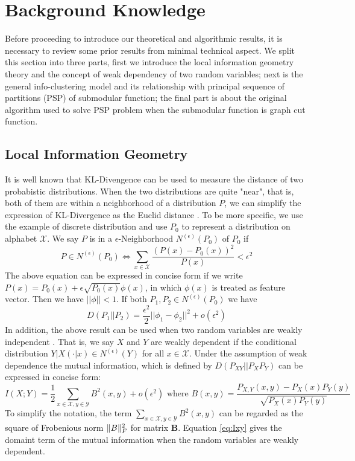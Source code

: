\section{Background Knowledge}\label{sec:bk}
Before proceeding to introduce our theoretical and algorithmic results, it is necessary to review some prior results from minimal technical aspect. We split this section into three parts, first we introduce
the local information geometry theory and the concept of weak dependency of two random variables;
next is the general info-clustering model and its relationship with principal sequence of partitions (PSP) of submodular function;
the final part is about the original algorithm used to solve PSP problem when the submodular function
is graph cut function.
\subsection{Local Information Geometry}
It is well known that KL-Divengence can be used to measure the distance of two probabistic distributions. When the two distributions are quite "near", that is, both of them are within a neighborhood of a distribution $P$, we can simplify the expression of KL-Divergence as the Euclid distance \citep{huang2017information}. To be more specific, we use the example of discrete distribution and use $P_0$ to represent a distribution on alphabet $\mathcal{X}$. We say $P$ is in a $\epsilon$-Neighborhood $N^{(\epsilon)}(P_0)$ of $P_0$ if
\begin{equation}
P \in N^{(\epsilon)}(P_0) \iff \sum_{x \in \mathcal{X}} \frac{(P(x) - P_0(x))^2}{P(x)} < \epsilon^2
\end{equation}
The above equation can be expressed in concise form if we write $P(x) = P_0(x) + \epsilon
\sqrt{P_0(x)} \phi(x)$, in which $\phi(x)$ is treated as feature vector. Then we have $||\phi || < 1$.
If both $P_1, P_2 \in N^{(\epsilon)}(P_0)$ we have
\begin{equation}\label{eq:approx:ig}
D(P_1 || P_2) = \frac{\epsilon^2}{2} ||\phi_1 - \phi_2||^2 + o(\epsilon^2)
\end{equation}
In addition, the above result can be used when two random variables are weakly independent \citep{huang2019universal}. That is, we say $X$ and $Y$ are weakly dependent if the conditional distribution $Y|X(\cdot |x) \in N^{(\epsilon)}(Y)$ for all $x \in \mathcal{X}$. Under the assumption of
weak dependence the mutual information, which is defined by $D(P_{XY}||P_XP_Y)$ can be expressed
in concise form:
\begin{equation}\label{eq:Ixy}
I(X;Y) = \frac{1}{2}\sum_{x\in \mathcal{X}, y\in \mathcal{Y}} B^2(x,y) + o(\epsilon^2) \textrm{ where }  B(x,y)=\frac{P_{X,Y}(x,y) - P_X(x) P_Y(y)}{\sqrt{P_X(x)P_Y(y)}}
\end{equation}
To simplify the notation, the term $\sum_{x\in \mathcal{X}, y\in \mathcal{Y}} B^2(x,y)$ can be regarded as the square of Frobenious norm $\lVert B\rVert_F^2$ for matrix $\bm{B}$. Equation \eqref{eq:Ixy} gives the domaint term
of the mutual information when the random variables are weakly dependent.

